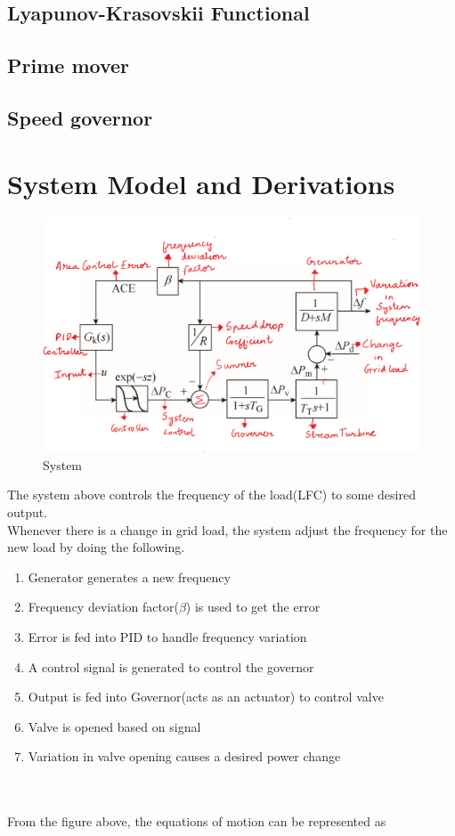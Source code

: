 \documentclass[journal]{IEEEtran}
\begin{document}
\subsection{Lyapunov-Krasovskii Functional}
\subsection{Prime mover}
\subsection{Speed governor}
\section{System Model and Derivations}

\begin{figure}
\includegraphics[width=\linewidth]{systemmodel.png}
  \caption{System}
  \label{fig:System1}
\end{figure}


The system above controls the frequency of the load(LFC) to some desired output. \\

Whenever there is a change in grid load, the system adjust the frequency for the new load by 
doing the following.

\begin{enumerate} 
  \item Generator generates a new frequency 
  \item Frequency deviation factor($\beta$) is used to get the error
  \item Error is fed into PID to handle frequency variation
  \item A control signal is generated to control the governor
  \item Output is fed into Governor(acts as an actuator) to control valve
  \item Valve is opened based on signal
  \item Variation in valve opening causes a desired power change  
 \end{enumerate} \\ \\
From the figure above, the equations of motion can be represented as 
\end{document}
